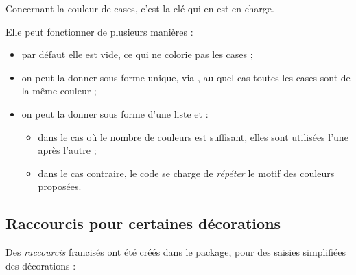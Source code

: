 \documentclass[11pt,a4paper]{ltxdoc}
\begin{document}
Concernant la couleur de cases, c'est la clé  qui en est en charge.

Elle peut fonctionner de plusieurs manières :

\begin{itemize}
	\item par défaut elle est vide, ce qui ne colorie pas les cases ;
	\item on peut la donner sous forme unique, via , au quel cas toutes les cases sont de la même couleur ;
	\item on peut la donner sous forme d'une liste  et :
	\begin{itemize}
		\item dans le cas où le nombre de couleurs est suffisant, elles sont utilisées l'une après l'autre ;
		\item dans le cas contraire, le code se charge de \textit{répéter} le motif des couleurs proposées.
	\end{itemize}
\end{itemize}

\subsection{Raccourcis pour certaines décorations}

Des \textit{raccourcis} francisés ont été créés dans le package, pour des saisies simplifiées des décorations :
\end{document}
